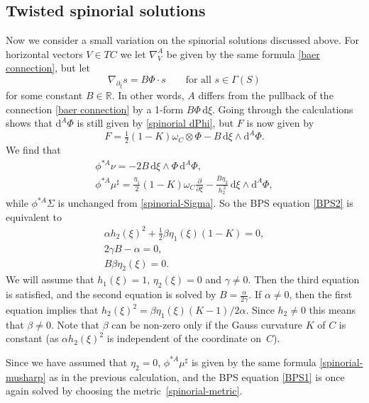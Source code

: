 \documentclass[10pt,a4paper]{amsart}
\newcommand{\R}{{\mathbb{R}}}
\newcommand{\1}{{\mathbb{1}}}
\def \d{\mathrm{d}}
\numberwithin{equation}{section}
\begin{document}
\subsection{Twisted spinorial solutions}
\label{sec:twisted}
Now we consider a small variation on the spinorial solutions discussed above. For horizontal vectors $V\in TC$ we let $\nabla^A_V$ be given by the same formula \eqref{baer connection}, but let
\begin{equation*}
\nabla_{\partial_\xi}s = B\Phi\cdot s\qquad\text{for all }s\in\Gamma(S)
\end{equation*}
for some constant $B\in\R$. In other words, $A$ differs from the pullback of the connection \eqref{baer connection} by a 1-form $B\Phi\,\d\xi$. Going through the calculations shows that $\d^A\Phi$ is still given by \eqref{spinorial dPhi}, but $F$ is now given by
\begin{equation*}
F = \tfrac{1}{2}(1-K)\omega_C\otimes\Phi-B\,\d\xi\wedge\d^A\Phi.
\end{equation*}
We find that
\begin{gather*}
\phi^{\ast A}\nu = -2B\,\d\xi\wedge\Phi\,\d^A\Phi, \\
\phi^{\ast A}\mu^\sharp = \frac{\eta_1}{2}(1-K)\omega_C\frac{\partial}{\partial\xi} - \frac{B\eta_2}{h_2^{\,2}}\,\d\xi\wedge\d^A\Phi,
\end{gather*}
while $\phi^{\ast A}\Sigma$ is unchanged from \eqref{spinorial-Sigma}. So the BPS equation \eqref{BPS2} is equivalent to
\begin{gather*}
\alpha h_2(\xi)^2 + \tfrac{1}{2}\beta\eta_1(\xi)(1-K) =0,\\
2\gamma B-\alpha =0, \\
B\beta\eta_2(\xi) =0.
\end{gather*}
We will assume that $h_1(\xi)=1$, $\eta_2(\xi)=0$ and $\gamma\neq0$. Then the third equation is satisfied, and the second equation is solved by $B=\frac{\alpha}{2\gamma}$. If $\alpha\neq0$, then the first equation implies that $h_2(\xi)^2=\beta\eta_1(\xi)(K-1)/2\alpha$. Since $h_2\neq0$ this means that $\beta\neq0$. Note that $\beta$ can be non-zero only if the Gauss curvature $K$ of $C$ is constant (as $\alpha h_2(\xi)^2$ is independent of the coordinate on~$C$).

Since we have assumed that $\eta_2=0$, $\phi^{\ast A}\mu^\sharp$ is given by the same formula \eqref{spinorial-musharp} as in the previous calculation, and the BPS equation \eqref{BPS1} is once again solved by choosing the metric~\eqref{spinorial-metric}.
\end{document}
